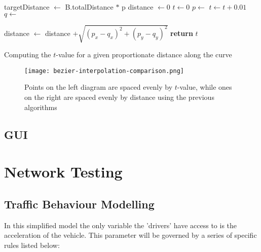     \begin{algorithm}
        \begin{algorithmic}
                \State targetDistance $\gets$ B.totalDistance $*$ p
                \State distance $\gets 0$
                \State $t \gets 0$
                    \State $p \gets$ 
                    \State $t \gets t + 0.01$
                    \State $q \gets$ 

                    \State distance $\gets$ distance $+ \sqrt{(p_x - q_x)^2 + (p_y - q_y)^2}$
                \EndWhile
                \State \textbf{return} $t$
            \EndFunction
        \end{algorithmic}
        \caption{Computing the $t$-value for a given proportionate distance along the curve}
        \label{proportionate-distance-algorithm}
    \end{algorithm}

    \begin{figure}
        \centering
        \texttt{[image: bezier-interpolation-comparison.png]}
        \caption{Points on the left diagram are spaced evenly by $t$-value, while ones on the right are spaced evenly by distance using the previous algorithms}
        \label{bezier-interpolation-comparison}
    \end{figure}

    \subsection{GUI}

\section{Network Testing}

    \subsection{Traffic Behaviour Modelling}

    In this simplified model the only variable the 'drivers' have access to is the acceleration of the vehicle. This parameter will be governed by a series of specific rules listed below:

